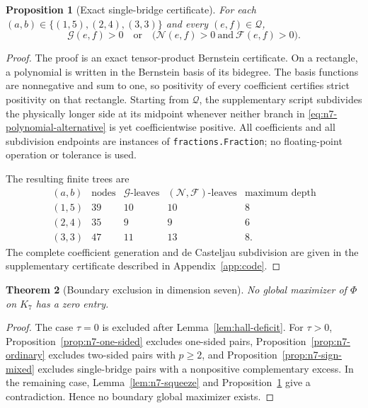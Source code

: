 \documentclass[11pt]{article}
\newtheorem{theorem}{Theorem}[section]
\newtheorem{proposition}[theorem]{Proposition}
\theoremstyle{definition}
\newcommand{\1}{\mathbf{1}}
\begin{document}
\begin{proposition}[Exact single-bridge certificate]\label{prop:n7-bernstein}
For each $(a,b)\in\{(1,5),(2,4),(3,3)\}$ and every $(e,f)\in\mathcal Q$,
\[
 \mathcal G(e,f)>0
 \quad\text{or}\quad
 \bigl(\mathcal N(e,f)>0\ \text{and}\ \mathcal F(e,f)>0\bigr).
 \tag{8.37}\label{eq:n7-polynomial-alternative}
\]
\end{proposition}

\begin{proof}
The proof is an exact tensor-product Bernstein certificate.  On a rectangle,
a polynomial is written in the Bernstein basis of its bidegree.  The basis
functions are nonnegative and sum to one, so positivity of every coefficient
certifies strict positivity on that rectangle.  Starting from $\mathcal Q$,
the supplementary script subdivides the physically longer side at its
midpoint whenever neither branch in
\eqref{eq:n7-polynomial-alternative} is yet coefficientwise positive.  All
coefficients and all subdivision endpoints are instances of
\texttt{fractions.Fraction}; no floating-point operation or tolerance is
used.

The resulting finite trees are
\[
\begin{array}{c|rrrr}
(a,b)&\text{nodes}&\mathcal G\text{-leaves}&
 (\mathcal N,\mathcal F)\text{-leaves}&\text{maximum depth}\\ \hline
(1,5)&39&10&10&8\\
(2,4)&35&9&9&6\\
(3,3)&47&11&13&8.
\end{array}
 \tag{8.38}\label{eq:n7-bernstein-tree}
\]
The complete coefficient generation and de Casteljau subdivision are given
in the supplementary certificate described in Appendix~\ref{app:code}.
\end{proof}

\begin{theorem}[Boundary exclusion in dimension seven]
\label{thm:boundary-seven}
No global maximizer of $\Phi$ on $K_7$ has a zero entry.
\end{theorem}

\begin{proof}
The case $\tau=0$ is excluded after Lemma~\ref{lem:hall-deficit}.
For $\tau>0$, Proposition~\ref{prop:n7-one-sided} excludes one-sided pairs,
Proposition~\ref{prop:n7-ordinary} excludes two-sided pairs with $p\ge2$,
and Proposition~\ref{prop:n7-sign-mixed} excludes single-bridge pairs with a
nonpositive complementary excess.  In the remaining case,
Lemma~\ref{lem:n7-squeeze} and Proposition~\ref{prop:n7-bernstein} give a
contradiction.  Hence no boundary global maximizer exists.
\end{proof}
\end{document}

